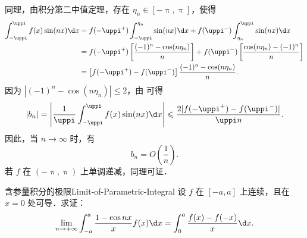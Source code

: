 \begin{myproof}
    同理，由积分第二中值定理，存在 $\eta_n \in [-\uppi, \uppi]$，使得
    \begin{equation}\label{eq:bn-integral-4}
        \begin{aligned}
            \int_{-\uppi}^{\uppi} f(x) \sin(nx) \d x & = f(-\uppi^+) \int_{-\uppi}^{\eta_n} \sin(nx) \d x + f(\uppi^-) \int_{\eta_n}^{\uppi} \sin(nx) \d x                        \\
                                                     & = f(-\uppi^+) \left[ \frac{(-1)^n - \cos(n\eta_n)}{n} \right] + f(\uppi^-) \left[ \frac{\cos(n\eta_n) - (-1)^n}{n} \right] \\
                                                     & = \left[ f(-\uppi^+) - f(\uppi^-) \right] \frac{(-1)^n - \cos(n\eta_n)}{n}.
        \end{aligned}
    \end{equation}
    因为 $|(-1)^n - \cos(n\eta_n)| \leqslant 2$，由  可得
    \begin{equation}
        |b_n| = \left| \frac{1}{\uppi} \int_{-\uppi}^{\uppi} f(x) \sin(nx) \d x \right| \leqslant \frac{2|f(-\uppi^+) - f(\uppi^-)|}{\uppi n}.
    \end{equation}
    因此，当 $n \to \infty$ 时，有
    \begin{equation}
        b_n = O\left(\frac{1}{n}\right).
    \end{equation}
    若 $f$ 在 $(-\uppi, \uppi)$ 上单调递减，同理可证．
\end{myproof}

\begin{problem}{含参量积分的极限}{Limit-of-Parametric-Integral}
    设 $f$ 在 $[-a, a]$ 上连续，且在 $x = 0$ 处可导．求证：
    \begin{equation}
        \lim_{n \to +\infty} \int_{-a}^{a} \frac{1 - \cos n x}{x} f(x) \d x = \int_{0}^{a} \frac{f(x) - f(-x)}{x} \d x.
    \end{equation}
\end{problem}


